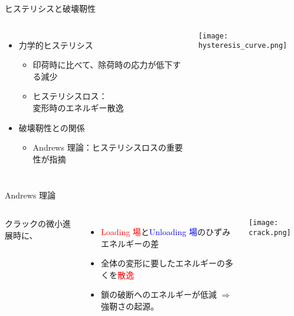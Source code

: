 \begin{columns}[totalwidth=.9\linewidth]
    \column{\textwidth}
    \begin{itembox}[l]{ヒステリシスと破壊靭性}
        \begin{columns}[totalwidth=\linewidth]
                \begin{itemize}
                    \item 力学的ヒステリシス
                    \begin{itemize}
                        \item
                        印荷時に比べて、除荷時の応力が低下する減少
                        \item
                        ヒステリシスロス：\\変形時のエネルギー散逸
                    \end{itemize}
                    \item 破壊靭性との関係
                    \begin{itemize}
                        \item
                        Andrews 理論：ヒステリシスロスの重要性が指摘
                    \end{itemize}
                \end{itemize}
                \centering
                \texttt{[image: hysteresis\_curve.png]}
            \end{columns}
    \end{itembox}
\end{columns}

\begin{columns}[totalwidth=.9\linewidth]
    \column{\textwidth}
    \begin{itembox}[l]{Andrews 理論\cite{andrews}}
        \begin{columns}[totalwidth=\textwidth]
                クラックの微小進展時に、
                \begin{itemize}
                    \item
                    \textcolor{red}{Loading 場}と\textcolor{blue}{Unloading 場}のひずみエネルギーの差
                    \item
                    全体の変形に要したエネルギーの多くを\textcolor{red}{散逸}
                    \item
                    鎖の破断へのエネルギーが低減 $\Rightarrow$ \alert{強靭さの起源。}
                \end{itemize}	
                \texttt{[image: crack.png]}     
        \end{columns}
    \end{itembox}
\end{columns}

